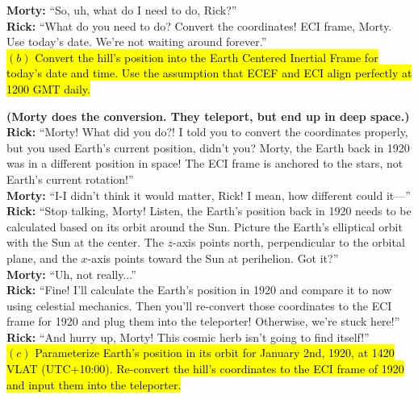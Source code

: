 \documentclass[a4paper, 12pt]{exam}
\begin{document}
\noindent \textbf{Morty:} “So, uh, what do I need to do, Rick?” \\

\noindent \textbf{Rick:} “What do you need to do? Convert the coordinates! ECI frame, Morty. Use today’s date. We’re not waiting around forever.” \\

\hl{$(b)$ Convert the hill's position into the Earth Centered Inertial Frame for today's date and time. Use the assumption that ECEF and ECI align perfectly at 1200 GMT daily.}


\bigskip
\noindent \textbf{(Morty does the conversion. They teleport, but end up in deep space.)} \\

\noindent \textbf{Rick:} “Morty! What did you do?! I told you to convert the coordinates properly, but you used Earth’s current position, didn’t you? Morty, the Earth back in 1920 was in a different position in space! The ECI frame is anchored to the stars, not Earth’s current rotation!” \\

\noindent \textbf{Morty:} “I-I didn’t think it would matter, Rick! I mean, how different could it—” \\

\noindent \textbf{Rick:} “Stop talking, Morty! Listen, the Earth’s position back in 1920 needs to be calculated based on its orbit around the Sun. Picture the Earth’s elliptical orbit with the Sun at the center. The $z$-axis points north, perpendicular to the orbital plane, and the $x$-axis points toward the Sun at perihelion. Got it?” \\

\noindent \textbf{Morty:} “Uh, not really...” \\

\noindent \textbf{Rick:} “Fine! I’ll calculate the Earth’s position in 1920 and compare it to now using celestial mechanics. Then you’ll re-convert those coordinates to the ECI frame for 1920 and plug them into the teleporter! Otherwise, we’re stuck here!” \\

\noindent \textbf{Rick:} “And hurry up, Morty! This cosmic herb isn’t going to find itself!” \\

\hl{$(c)$ Parameterize Earth's position in its orbit for January 2nd, 1920, at 1420 VLAT (UTC+10:00). Re-convert the hill's coordinates to the ECI frame of 1920 and input them into the teleporter.}
\end{document}
